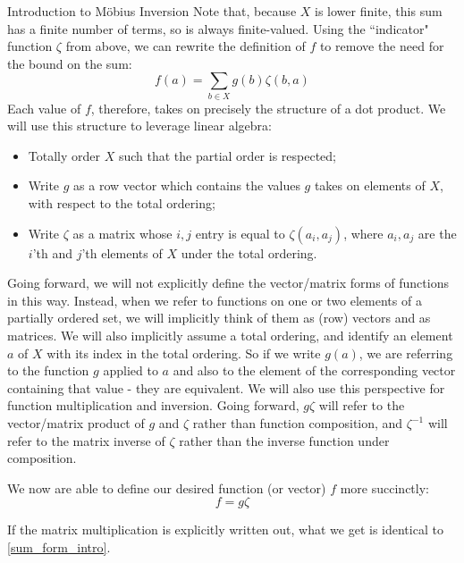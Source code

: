 \documentclass[12pt]{pom_thesis}
\begin{document}
\begin{chapter}{Introduction to M\"obius Inversion}
Note that, because $X$ is lower finite, this sum has a finite number of terms, so is always finite-valued. Using the ``indicator" function $\zeta$ from above, we can rewrite the definition of $f$ to remove the need for the bound on the sum:
\begin{equation}\label{sum_form_intro}
f(a) = \sum_{b \in X}g(b)\zeta(b,a)
\end{equation}
Each value of $f$, therefore, takes on precisely the structure of a dot product. We will use this structure to leverage linear algebra: 
\begin{itemize}
\item Totally order $X$ such that the partial order is respected;
\item Write $g$ as a row vector which contains the values $g$ takes on elements of $X$, with respect to the total ordering;
\item Write $\zeta$ as a matrix whose $i,j$ entry is equal to $\zeta(a_i, a_j)$, where $a_i, a_j$ are the $i$'th and $j$'th elements of $X$ under the total ordering.
\end{itemize}

Going forward, we will not explicitly define the vector/matrix forms of functions in this way. Instead, when we refer to functions on one or two elements of a partially ordered set, we will implicitly think of them as (row) vectors and as matrices. We will also implicitly assume a total ordering, and identify an element $a$ of $X$ with its index in the total ordering. So if we write $g(a)$, we are referring to the function $g$ applied to $a$ and also to the element of the corresponding vector containing that value - they are equivalent. We will also use this perspective for function multiplication and inversion. Going forward, $g\zeta$ will refer to the vector/matrix product of $g$ and $\zeta$ rather than function composition, and $\zeta^{-1}$ will refer to the matrix inverse of $\zeta$ rather than the inverse function under composition.

We now are able to define our desired function (or vector) $f$ more succinctly:
\[
f = g \zeta
\]

If the matrix multiplication is explicitly written out, what we get is identical to \ref{sum_form_intro}. %


\end{chapter}
\end{document}
